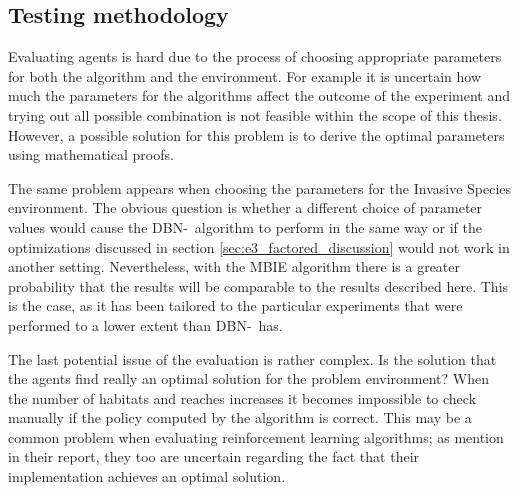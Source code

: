 \subsection{Testing methodology}

Evaluating agents is hard due to the process of choosing appropriate parameters
for both the algorithm and the environment. For example it is uncertain how
much the parameters for the algorithms affect the outcome of the experiment and
trying out all possible combination is not feasible within the scope of this
thesis. However, a possible solution for this problem is to derive the optimal
parameters using mathematical proofs.

The same problem appears when choosing the parameters for the Invasive Species
environment. The obvious question is whether a different choice of parameter values 
would cause the DBN-\etre\ algorithm to perform in the same way or if the optimizations
discussed in section \ref{sec:e3_factored_discussion} would not work in
another setting. Nevertheless, with the MBIE algorithm there is a greater
probability that the results will be comparable to the results described here. 
This is the case, as it has been tailored to the particular experiments that were performed to a lower extent
than DBN-\etre\ has.

The last potential issue of the evaluation is rather complex. Is the solution that the agents find really an optimal solution for the problem environment? When the number of habitats and reaches increases it becomes impossible to check manually if the policy computed by the algorithm is correct. This may be a common problem when evaluating reinforcement learning algorithms; as \textcite{dietterich2013pac} mention in their report, they too are uncertain regarding the fact that their implementation achieves an optimal solution. 

